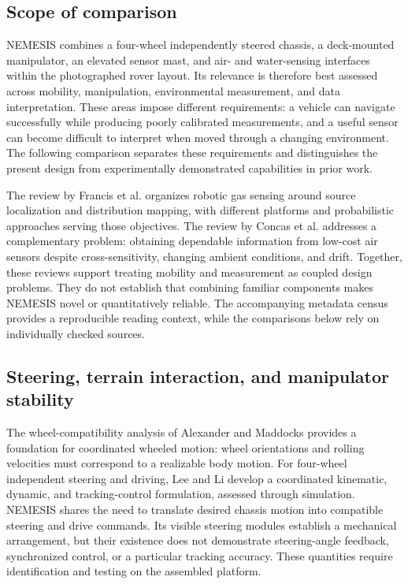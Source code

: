 \documentclass[11pt,a4paper]{article}
\begin{document}
\FloatBarrier

\subsection{Scope of comparison}\label{sec:3.1}

NEMESIS combines a four-wheel independently steered chassis, a deck-mounted manipulator, an elevated sensor mast, and air- and water-sensing interfaces within the photographed rover layout. Its relevance is therefore best assessed across mobility, manipulation, environmental measurement, and data interpretation. These areas impose different requirements: a vehicle can navigate successfully while producing poorly calibrated measurements, and a useful sensor can become difficult to interpret when moved through a changing environment. The following comparison separates these requirements and distinguishes the present design from experimentally demonstrated capabilities in prior work.

The review by Francis et al. \citep{francis2022_99d7b7} organizes robotic gas sensing around source localization and distribution mapping, with different platforms and probabilistic approaches serving those objectives. The review by Concas et al. \citep{concas2021_57ba0a} addresses a complementary problem: obtaining dependable information from low-cost air sensors despite cross-sensitivity, changing ambient conditions, and drift. Together, these reviews support treating mobility and measurement as coupled design problems. They do not establish that combining familiar components makes NEMESIS novel or quantitatively reliable. The accompanying metadata census provides a reproducible reading context, while the comparisons below rely on individually checked sources.

\FloatBarrier

\subsection{Steering, terrain interaction, and manipulator stability}\label{sec:3.2}

The wheel-compatibility analysis of Alexander and Maddocks \citep{alexander1989_c3c6fd} provides a foundation for coordinated wheeled motion: wheel orientations and rolling velocities must correspond to a realizable body motion. For four-wheel independent steering and driving, Lee and Li \citep{lee2015_5bfa55} develop a coordinated kinematic, dynamic, and tracking-control formulation, assessed through simulation. NEMESIS shares the need to translate desired chassis motion into compatible steering and drive commands. Its visible steering modules establish a mechanical arrangement, but their existence does not demonstrate steering-angle feedback, synchronized control, or a particular tracking accuracy. These quantities require identification and testing on the assembled platform.
\end{document}
